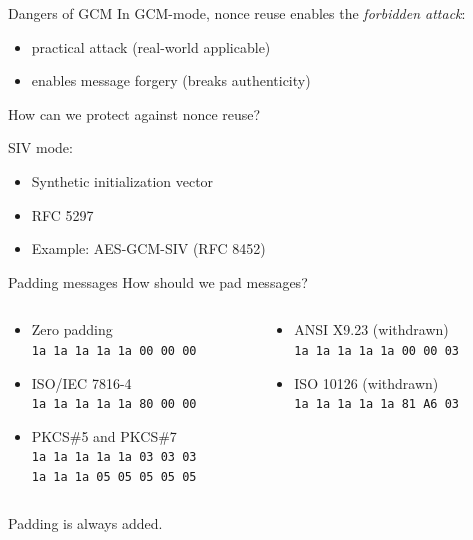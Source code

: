 \begin{frame}{Dangers of GCM}
  In GCM-mode, nonce reuse enables the \emph{forbidden attack}:
  \begin{itemize}[<+(1)->]
    \item practical attack (real-world applicable)
    \item enables message forgery (breaks authenticity)
  \end{itemize}

  \pause
  How can we protect against nonce reuse?

  \pause
  SIV mode:
  \begin{itemize}[<+->]
    \item Synthetic initialization vector
    \item RFC 5297
    \item Example: AES-GCM-SIV (RFC 8452)
  \end{itemize}
\end{frame}

\begin{frame}{Padding messages}
  How should we pad messages?

  \begin{columns}
    \begin{column}{0.5\textwidth}
      \begin{itemize}[<+(1)->]
        \item Zero padding\\
        \texttt{1a 1a 1a 1a 1a 00 00 00}
        \item ISO/IEC 7816-4\\
        \texttt{1a 1a 1a 1a 1a 80 00 00}
        \item PKCS\#5 and PKCS\#7\\
        \texttt{1a 1a 1a 1a 1a 03 03 03}\\
        \texttt{1a 1a 1a 05 05 05 05 05}
      \end{itemize}
    \end{column}
    \begin{column}{0.5\textwidth}
      \begin{itemize}[<+(1)->]
        \item ANSI X9.23 (withdrawn)\\
        \texttt{1a 1a 1a 1a 1a 00 00 03}
        \item ISO 10126 (withdrawn)\\
        \texttt{1a 1a 1a 1a 1a 81 A6 03}
      \end{itemize}
    \end{column}
  \end{columns}

  \vspace*{1em}

  \pause
  Padding is always added.
\end{frame}

